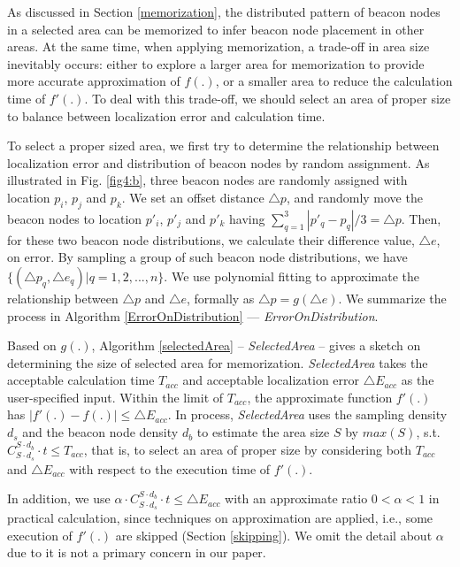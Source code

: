 \documentclass[10pt, conference, letterpaper]{IEEEtran}
\begin{document}
As discussed in Section \ref{memorization}, the distributed pattern of beacon nodes in a selected area can be memorized to infer beacon node placement in other areas. At the same time, when applying memorization, a trade-off in area size inevitably occurs: either to explore a larger area for memorization to provide more accurate approximation of $f(.)$, or a smaller area to reduce the calculation time of $f'(.)$. To deal with this trade-off, we should select an area of proper size to balance between localization error and calculation time.

To select a proper sized area, we first try to determine the relationship between localization error and distribution of beacon nodes by random assignment. As illustrated in Fig. \ref{fig4:b}, three beacon nodes are randomly assigned with location $p_i$, $p_j$ and $p_k$. We set an offset distance $\triangle p$, and randomly move the beacon nodes to location $p'_i$, $p'_j$ and $p'_k$ having $\sum_{q=1}^3 |p'_q-p_q|/3 = \triangle p$. Then, for these two beacon node distributions, we calculate their difference value, $\triangle e$, on error. By sampling a group of such beacon node distributions, we have $\{(\triangle p_q, \triangle e_q) | q=1,2,...,n\}$. We use polynomial fitting to approximate the relationship between $\triangle p$ and $\triangle e$, formally as $\triangle p = g(\triangle e)$. We summarize the process in Algorithm \ref{ErrorOnDistribution} --- \textit{ErrorOnDistribution}.

Based on $g(.)$, Algorithm \ref{selectedArea} -- \textit{SelectedArea} -- gives a sketch on determining the size of selected area for memorization. \textit{SelectedArea} takes the acceptable calculation time $T_{acc}$ and acceptable localization error $\triangle E_{acc}$ as the user-specified input. Within the limit of $T_{acc}$, the approximate function $f'(.)$ has $|f'(.)-f(.)| \leq \triangle E_{acc}$. In process, \textit{SelectedArea} uses the sampling density $d_s$ and the beacon node density $d_b$ to estimate the area size $S$ by $max(S)$, s.t. $C_{S \cdot d_s}^{S \cdot d_b} \cdot t \leq T_{acc}$, that is, to select an area of proper size by considering both $T_{acc}$ and $\triangle E_{acc}$ with respect to the execution time of $f'(.)$.

In addition, we use $\alpha \cdot C_{S \cdot d_s}^{S \cdot d_b} \cdot t \leq \triangle E_{acc}$ with an approximate ratio $0 < \alpha < 1$ in practical calculation, since techniques on approximation are applied, i.e., some execution of $f'(.)$ are skipped (Section \ref{skipping}). We omit the detail about $\alpha$ due to it is not a primary concern in our paper.
\end{document}
